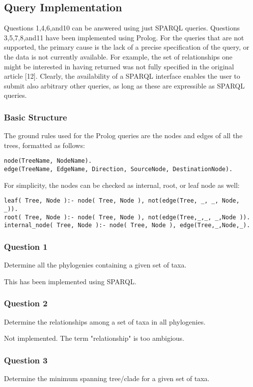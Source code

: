 \documentclass[10pt]{article}
\begin{document}
\subsection{Query Implementation}
Questions 1,4,6,and10 can be answered using just SPARQL queries.  Questions 3,5,7,8,and11 have been implemented using Prolog.   For the queries that are not supported, the primary cause is the lack of a precise specification of the query, or the data is not currently available. For example, the set of relationships one might be interested in having returned was not fully specified in the original article [12].  Clearly, the availability of a SPARQL interface enables the user to submit also arbitrary other queries, as long as these are expressible as SPARQL queries.
\subsubsection{Basic Structure}

The ground rules used for the Prolog queries are the nodes and edges of all the trees, formatted as follows:
\begin{verbatim}
node(TreeName, NodeName).
edge(TreeName, EdgeName, Direction, SourceNode, DestinationNode).
\end{verbatim}

For simplicity, the nodes can be checked as internal, root, or leaf node as well:
\begin{verbatim}
leaf( Tree, Node ):- node( Tree, Node ), not(edge(Tree, _, _, Node, _)).
root( Tree, Node ):- node( Tree, Node ), not(edge(Tree,_,_, _,Node )).
internal_node( Tree, Node ):- node( Tree, Node ), edge(Tree,_,Node,_).
\end{verbatim}

\subsubsection{Question 1}
 Determine all the phylogenies containing a given set of taxa.

This has been implemented using SPARQL.

\subsubsection{Question 2}
Determine the relationships among a set of taxa in all phylogenies.

Not implemented.  The term "relationship" is too ambigious.

\subsubsection{Question 3}
Determine the minimum spanning tree/clade for a given set of taxa.
\end{document}
